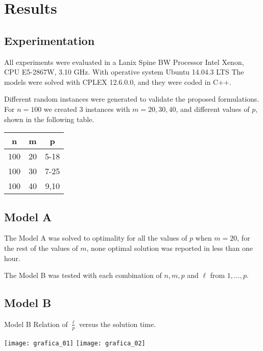 
\section{Results}
\subsection{Experimentation}
\begin{frame}
  All experiments were evaluated in a Lanix Spine BW
  Processor Intel Xenon, CPU E5-2867W, 3.10 GHz.
  With operative system Ubuntu 14.04.3 LTS
  The models were solved with CPLEX 12.6.0.0,
  and they were coded in C++.
\end{frame}

\begin{frame}
  Different random instances were generated
  to validate the proposed formulations.
  For $n = 100$ we created 3 instances with $m = 20,30,40$,
  and different values of $p$, shown in the following table.
  \begin{table}
    \centerign
    \begin{tabular}{|c|c|c|}\hline
      n & m & p \\ \hline
      100 & 20 & 5-18 \\
      100 & 30 & 7-25 \\
      100 & 40 & 9,10 \\
      \hline
    \end{tabular}
  \end{table}
\end{frame}

\subsection{Model A}
\begin{frame}
  The Model A was solved to optimality for all the values of $p$ when $m = 20$,
  for the rest of the values of $m$, none optimal solution was reported in less than one hour.

  The Model B was tested with each combination of $n,m,p$ and $\ell$ from $1,\ldots,p$.

\end{frame}

\subsection{Model B}
\begin{frame}{Model B}
  Relation of $\frac{\ell}{p}$ versus the solution time.
  \begin{center}
    \texttt{[image: grafica\_01]}
    \texttt{[image: grafica\_02]}
  \end{center}
\end{frame}

